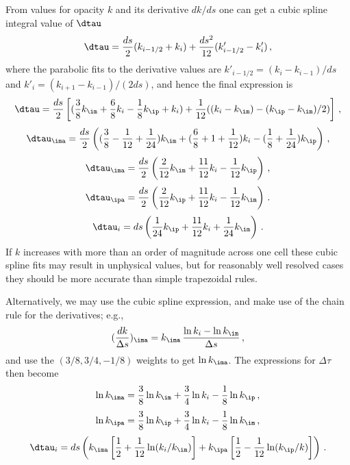 \documentclass[paper=a4,fontsize=11pt]{scrartcl}
\numberwithin{equation}{section}		%
\numberwithin{figure}{section}			%
\numberwithin{table}{section}				%
\begin{document}
From values for opacity $k$ and its derivative $dk/ds$ one can get a cubic spline integral value of $\dtau$
\begin{equation}
    \dtau = \frac{ds}{2} (k_{i-1/2}+k_i) + 
    \frac{ds^2}{12}(k'_{i-1/2}-k'_{i}) \,,
\end{equation}
where the parabolic fits to the derivative values are $k'_{i-1/2}=(k_i-k_{i-1})/ds$ and $k'_i=(k_{i+1}-k_{i-1})/(2 ds)$, and hence the final expression is
\begin{equation}
    \dtau = \frac{ds}{2} \left[
    ( \frac{3}{8} k_{\im} + \frac{6}{8}k_i - \frac{1}{8} k_{\ip} + k_i ) + 
    \frac{1}{12} ( (k_i-k_{\im})-(k_{\ip} - k_{\im})/2 ) \right] \,,
\end{equation}
\begin{equation}
    \dtau_\ima = \frac{ds}{2} \left(
    (\frac{3}{8}-\frac{1}{12}+\frac{1}{24})k_{\im} +
    (\frac{6}{8}+1+\frac{1}{12})k_i -
    (\frac{1}{8}+\frac{1}{24})k_\ip 
    \right) \,,
\end{equation}
\begin{equation}
    \dtau_\ima = \frac{ds}{2} \left(
    \frac{2}{12}k_\im +
    \frac{11}{12}k_i -
    \frac{1}{12}k_\ip 
    \right) \,,
\end{equation}
\begin{equation}
    \dtau_\ipa = \frac{ds}{2} \left(
    \frac{2}{12}k_\ip +
    \frac{11}{12}k_i -
    \frac{1}{12}k_\im 
    \right) \,.
\end{equation}
\begin{equation}
    \dtau_{i} = {ds} \left(
    \frac{1}{24}k_\ip +
    \frac{11}{12}k_i +
    \frac{1}{24}k_\im 
    \right) \,.
\end{equation}
If $k$ increases with more than an order of magnitude across one cell these cubic spline fits may result in unphysical values, but for reasonably well resolved cases they should be more accurate than simple trapezoidal rules.

Alternatively, we may use the cubic spline expression, and make use of the chain rule for the derivatives; e.g.,
\begin{equation}
    (\frac{dk}{\Delta s})_\ima=
    k_\ima\,
    \frac{\ln k_i-\ln k_\im}{\Delta s} \,,
\end{equation}
and use the $(3/8,3/4,-1/8)$ weights to get $\ln k_\ima$. The expressions for $\Delta\tau$ then become
\begin{equation}
    \ln k_\ima=\frac{3}{8}\ln k_\im + \frac{3}{4}\ln k_i - \frac{1}{8}\ln k_\ip \,,
\end{equation}
\begin{equation}
    \ln k_\ipa=\frac{3}{8}\ln k_\ip + \frac{3}{4}\ln k_i - \frac{1}{8}\ln k_\im \,,
\end{equation}\begin{equation}
    \dtau_i = ds \left(
    k_\ima \left[\frac{1}{2} + \frac{1}{12}\ln (k_i/k_\im)\right] + 
    k_\ipa \left[\frac{1}{2} - \frac{1}{12}\ln (k_\ip/k)\right]
    \right) \,.
\end{equation}
\end{document}
